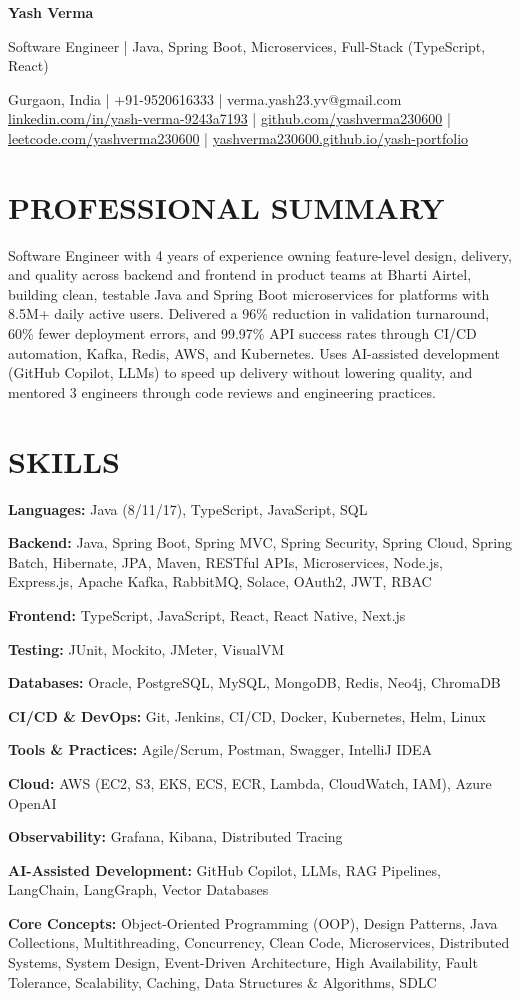 \documentclass[10.5pt,a4paper]{article}
\newcommand{\skill}[2]{\textbf{#1:} #2\par\vspace{1pt}}
\begin{document}
{\color{navy}\bfseries\fontsize{22}{24}\selectfont Yash Verma}\par\vspace{3pt}
{\color{greytxt}\large Software Engineer | Java, Spring Boot, Microservices, Full-Stack (TypeScript, React)}\par\vspace{3pt}
{\color{greytxt}\small Gurgaon, India | +91-9520616333 | verma.yash23.yv@gmail.com\\
\href{https://www.linkedin.com/in/yash-verma-9243a7193/}{linkedin.com/in/yash-verma-9243a7193} | \href{https://github.com/yashverma230600}{github.com/yashverma230600} | \href{https://leetcode.com/yashverma230600}{leetcode.com/yashverma230600} | \href{https://yashverma230600.github.io/yash-portfolio/}{yashverma230600.github.io/yash-portfolio}}\par
\vspace{3pt}{\color{greytxt}\rule{\linewidth}{0.6pt}}

\section{PROFESSIONAL SUMMARY}
Software Engineer with 4 years of experience owning feature-level design, delivery, and quality across backend and frontend in product teams at Bharti Airtel, building clean, testable Java and Spring Boot microservices for platforms with 8.5M+ daily active users. Delivered a 96\% reduction in validation turnaround, 60\% fewer deployment errors, and 99.97\% API success rates through CI/CD automation, Kafka, Redis, AWS, and Kubernetes. Uses AI-assisted development (GitHub Copilot, LLMs) to speed up delivery without lowering quality, and mentored 3 engineers through code reviews and engineering practices.

\section{SKILLS}
\skill{Languages}{Java (8/11/17), TypeScript, JavaScript, SQL}
\skill{Backend}{Java, Spring Boot, Spring MVC, Spring Security, Spring Cloud, Spring Batch, Hibernate, JPA, Maven, RESTful APIs, Microservices, Node.js, Express.js, Apache Kafka, RabbitMQ, Solace, OAuth2, JWT, RBAC}
\skill{Frontend}{TypeScript, JavaScript, React, React Native, Next.js}
\skill{Testing}{JUnit, Mockito, JMeter, VisualVM}
\skill{Databases}{Oracle, PostgreSQL, MySQL, MongoDB, Redis, Neo4j, ChromaDB}
\skill{CI/CD \& DevOps}{Git, Jenkins, CI/CD, Docker, Kubernetes, Helm, Linux}
\skill{Tools \& Practices}{Agile/Scrum, Postman, Swagger, IntelliJ IDEA}
\skill{Cloud}{AWS (EC2, S3, EKS, ECS, ECR, Lambda, CloudWatch, IAM), Azure OpenAI}
\skill{Observability}{Grafana, Kibana, Distributed Tracing}
\skill{AI-Assisted Development}{GitHub Copilot, LLMs, RAG Pipelines, LangChain, LangGraph, Vector Databases}
\skill{Core Concepts}{Object-Oriented Programming (OOP), Design Patterns, Java Collections, Multithreading, Concurrency, Clean Code, Microservices, Distributed Systems, System Design, Event-Driven Architecture, High Availability, Fault Tolerance, Scalability, Caching, Data Structures \& Algorithms, SDLC}
\end{document}
